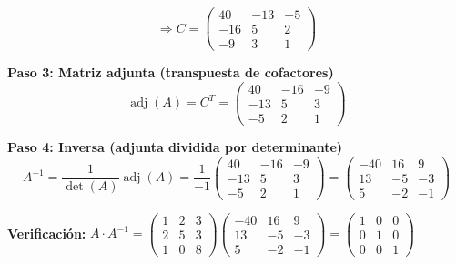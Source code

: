 \begin{prob}
\begin{myproof}
\[
\Rightarrow C = \begin{pmatrix} 40 & -13 & -5 \\ -16 & 5 & 2 \\ -9 & 3 & 1 \end{pmatrix}
\]

\textbf{Paso 3: Matriz adjunta (transpuesta de cofactores)}
\[
\operatorname{adj}(A) = C^T = \begin{pmatrix} 40 & -16 & -9 \\ -13 & 5 & 3 \\ -5 & 2 & 1 \end{pmatrix}
\]

\textbf{Paso 4: Inversa (adjunta dividida por determinante)}
\[
A^{-1} = \frac{1}{\det(A)} \operatorname{adj}(A) = \frac{1}{-1} \begin{pmatrix} 40 & -16 & -9 \\ -13 & 5 & 3 \\ -5 & 2 & 1 \end{pmatrix} = \boxed{\begin{pmatrix} -40 & 16 & 9 \\ 13 & -5 & -3 \\ 5 & -2 & -1 \end{pmatrix}}
\]

\textbf{Verificación:} \( A \cdot A^{-1} = \begin{pmatrix} 1 & 2 & 3 \\ 2 & 5 & 3 \\ 1 & 0 & 8 \end{pmatrix} \begin{pmatrix} -40 & 16 & 9 \\ 13 & -5 & -3 \\ 5 & -2 & -1 \end{pmatrix} = \begin{pmatrix} 1 & 0 & 0 \\ 0 & 1 & 0 \\ 0 & 0 & 1 \end{pmatrix}
\)
\end{myproof}
\end{prob}



